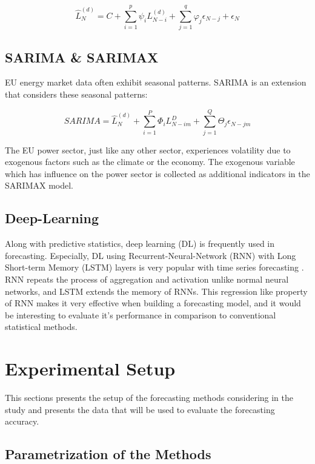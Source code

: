 \documentclass[acmtog]{acmart}
\begin{document}
\begin{equation}
    \hat{L}_N^{(d)} = C + \sum_{i=1}^{p} \psi_i L_{N - i}^{(d)} + \sum_{j=1}^{q}\varphi_j\epsilon_{N-j} + \epsilon_{N}
\end{equation}

\subsection{SARIMA \& SARIMAX}
EU energy market data often exhibit seasonal patterns. SARIMA is an extension that considers these seasonal patterns:

\begin{equation}
    SARIMA = \hat{L}_N^{(d)} + \sum_{i=1}^{P}\Phi_i L_{N - im}^{D} + \sum_{j=1}^{Q}\Theta_j \epsilon_{N - jm}  
\end{equation} 

The EU power sector, just like any other sector, experiences volatility due to exogenous factors such as the climate or the economy. The exogenous variable which has influence on the power sector is collected as additional indicators in the SARIMAX model. 

\subsection{Deep-Learning}
Along with predictive statistics, deep learning (DL) is frequently used in forecasting. Especially, DL using Recurrent-Neural-Network (RNN) with Long Short-term Memory (LSTM) layers is very popular with time series forecasting \cite{raval2018forecasting}. RNN repeats the process of aggregation and activation unlike normal neural networks, and LSTM extends the memory of RNNs. This regression like property of RNN makes it very effective when building a forecasting model, and it would be interesting to evaluate it's performance in comparison to conventional statistical methods.

\section{Experimental Setup}
This sections presents the setup of the forecasting methods considering in the study and presents the data that will be used to evaluate the forecasting accuracy.

\subsection{Parametrization of the Methods}
\end{document}
